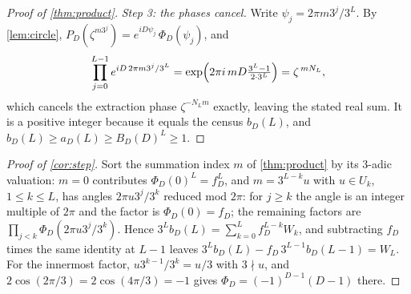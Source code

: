 \documentclass[11pt]{amsart}
\theoremstyle{definition}
\theoremstyle{remark}
\begin{document}
\begin{proof}[Proof of \cref{thm:product}]
\emph{Step 3: the phases cancel.} Write $\psi_j = 2\pi m 3^j/3^L$. By \cref{lem:circle}, $P_D(\zeta^{m3^j}) = e^{iD\psi_j}\,\Phi_D(\psi_j)$, and
\[
\prod_{j=0}^{L-1} e^{iD\, 2\pi m 3^j/3^L} = \exp\Bigl( 2\pi i\, m D \tfrac{3^L-1}{2 \cdot 3^L} \Bigr) = \zeta^{\,m N_L},
\]
which cancels the extraction phase $\zeta^{-N_L m}$ exactly, leaving the stated real sum. It is a positive integer because it equals the census $b_D(L)$, and $b_D(L) \ge a_D(L) \ge B_D(D)^L \ge 1$.
\end{proof}

\begin{proof}[Proof of \cref{cor:step}]
Sort the summation index $m$ of \cref{thm:product} by its $3$-adic valuation: $m = 0$ contributes $\Phi_D(0)^L = f_D^L$, and $m = 3^{L-k} u$ with $u \in U_k$, $1 \le k \le L$, has angles $2\pi u 3^j/3^k$ reduced mod $2\pi$: for $j \ge k$ the angle is an integer multiple of $2\pi$ and the factor is $\Phi_D(0) = f_D$; the remaining factors are $\prod_{j<k} \Phi_D(2\pi u 3^j/3^k)$. Hence $3^L b_D(L) = \sum_{k=0}^{L} f_D^{L-k} W_k$, and subtracting $f_D$ times the same identity at $L-1$ leaves $3^L b_D(L) - f_D\, 3^{L-1} b_D(L-1) = W_L$. For the innermost factor, $u 3^{k-1}/3^k = u/3$ with $3 \nmid u$, and $2\cos(2\pi/3) = 2\cos(4\pi/3) = -1$ gives $\Phi_D = (-1)^{D-1}(D-1)$ there.
\end{proof}
\end{document}
